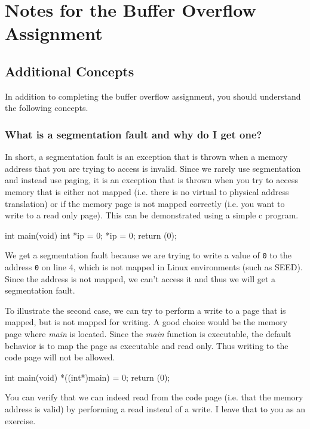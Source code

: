 \chapter{Notes for the Buffer Overflow Assignment}

\section{Additional Concepts}
In addition to completing the buffer overflow assignment, you should understand the following concepts.

\subsection{What is a segmentation fault and why do I get one?}

In short, a segmentation fault is an exception that is thrown when a memory address that you are trying to access is invalid. Since we rarely use segmentation and instead use paging, it is an exception that is thrown when you try to access memory that is either not mapped (i.e. there is no virtual to physical address translation) or if the memory page is not mapped correctly (i.e. you want to write to a read only page). This can be demonstrated using a simple c program. 

\begin{code}
int main(void)
{
  int *ip = 0;
  *ip = 0;
  return (0);
}
\end{code}

We get a segmentation fault because we are trying to write a value of {\tt 0} to the address {\tt 0} on line 4, which is not mapped in Linux environments (such as SEED). Since the address is not mapped, we can’t access it and thus we will get a segmentation fault.

To illustrate the second case, we can try to perform a write to a page that is mapped, but is not mapped for writing. A good choice would be the memory page where {\em main} is located. Since the {\em main} function is executable, the default behavior is to map the page as executable and read only. Thus writing to the code page will not be allowed.

\begin{code}
int main(void)
{
  *((int*)main) = 0;
  return (0);
}
\end{code}

You can verify that we can indeed read from the code page (i.e. that the memory address is valid) by performing a read instead of a write. I leave that to you as an exercise.


